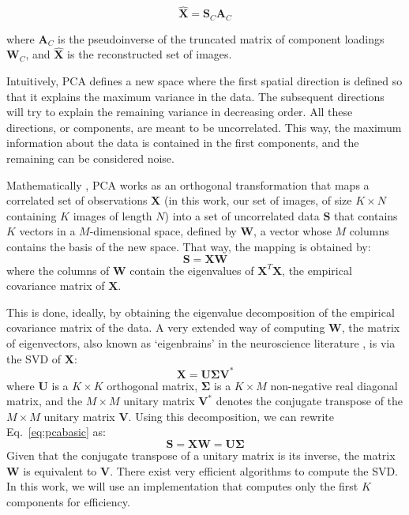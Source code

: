 \begin{equation}\label{eq:swpcareconst}
	\hat{\mathbf{X}}=\mathbf{S}_C \mathbf{A}_C
\end{equation}

where  $\mathbf{A}_C$ is the pseudoinverse of the truncated matrix of
component loadings  $\mathbf{W}_C$, and  $\hat{\mathbf{X}}$ is the
reconstructed set of images.


Intuitively, PCA defines a new space where the first spatial direction is defined so that it explains the maximum variance in the data. The subsequent directions will try to explain the remaining variance in decreasing order. All these directions, or components, are meant to be uncorrelated. This way, the maximum information about the data is contained in the first components, and the remaining can be considered noise. 

Mathematically \cite{Brown2009}, PCA works as an orthogonal transformation that maps a correlated set of observations $\mathbf{X}$ (in this work, our set of images, of size $K\times N$ containing $K$ images of length $N$) into a set of uncorrelated data $\mathbf{S}$ that contains $K$ vectors in a $M$-dimensional space, defined by $\mathbf{W}$, a vector whose $M$ columns contains the basis of the new space. That way, the mapping is obtained by: 
\begin{equation}\label{eq:pcabasic}
\mathbf{S} = \mathbf{X}\mathbf{W}
\end{equation}
where the columns of $\mathbf{W}$ contain the eigenvalues of $\mathbf{X}^T\mathbf{X}$, the empirical covariance matrix of $\mathbf{X}$. 

This is done, ideally, by obtaining the eigenvalue decomposition of the empirical covariance matrix of the data. A very extended way of computing $\mathbf{W}$, the matrix of eigenvectors, also known as `eigenbrains' in the neuroscience literature \cite{Illan2011}, is via the \acf{SVD} of $\mathbf{X}$:
\begin{equation}
\mathbf{X} = \mathbf{U} \boldsymbol{\Sigma} \mathbf{V}^* 
\end{equation}
where $\mathbf{U}$ is a $K\times K$ orthogonal matrix, $\mathbf{\Sigma}$ is a $K\times M$ non-negative real diagonal matrix, and the $M\times M$ unitary matrix $\mathbf{V}^*$ denotes the conjugate transpose of the $M\times M$ unitary matrix $\mathbf{V}$. Using this decomposition, we can rewrite Eq.~\ref{eq:pcabasic} as: 
\begin{equation}\label{eq:trunkPCA}
\mathbf{S} =  \mathbf{X} \mathbf{W} = \mathbf{U}\mathbf{\Sigma} 
\end{equation}
Given that the conjugate transpose of a unitary matrix is its inverse, the matrix $\mathbf{W}$ is equivalent to $\mathbf{V}$. There exist very efficient algorithms to compute the \ac{SVD}. In this work, we will use an implementation that computes only the first $K$ components for efficiency.  


